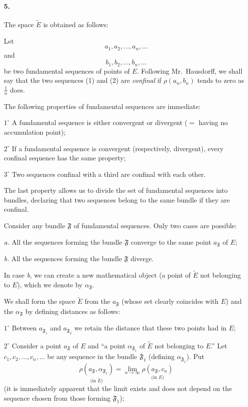 \documentclass[a4paper,12pt]{amsart}
\newcommand{\fais}{\mathfrak{F}}
\newcommand{\srcpage}[1]{} %
\begin{document}
\paragraph{5.}
The space $\widetilde{E}$ is obtained as follows:

Let
\begin{equation}\tag{1}
a_1,a_2,\dots,a_n,\dots
\end{equation}
and
\begin{equation}\tag{2}
b_1,b_2,\dots,b_n,\dots
\end{equation}
be two fundamental sequences of points of $E$. Following Mr.~Hausdorff, we shall say that the two sequences (1) and (2) are \textit{confinal} if $\rho(a_n,b_n)$ tends to zero as $\frac{1}{n}$ does.

The following properties of fundamental sequences are immediate:

$1^\circ$ A fundamental sequence is either convergent or divergent ($=$ having no accumulation point);

$2^\circ$ If a fundamental sequence is convergent (respectively, divergent), every confinal sequence has the same property;

$3^\circ$ Two sequences confinal with a third are confinal with each other.

The last property allows us to divide the set of fundamental sequences into bundles, declaring that two sequences belong to the same bundle if they are confinal.

Consider any bundle $\fais$ of fundamental sequences. Only two cases are possible:

\textit{a.} All the sequences forming the bundle $\fais$ converge to the same point $a_{\fais}$ of $E$;

\textit{b.} All the sequences forming the bundle $\fais$ diverge.

In case \textit{b}, we can create a new mathematical object (a point of $\widetilde{E}$ not belonging to $E$), which we denote by $\alpha_{\fais}$.

We shall form the space $\widetilde{E}$ from the $a_{\fais}$ (whose set clearly coincides with $E$) and the $\alpha_{\fais}$ by defining distances as follows:
\srcpage{48}

$1^\circ$ Between $a_{\fais_1}$ and $a_{\fais_2}$ we retain the distance that these two points had in $E$;

$2^\circ$ Consider a point $a_{\fais}$ of $E$ and ``a point $\alpha_{\fais_1}$ of $\widetilde{E}$ not belonging to $E$.'' Let $c_1,c_2,\dots,c_n,\dots$ be any sequence in the bundle $\fais_1$ (defining $\alpha_{\fais_1}$). Put
\[
\underset{\text{(in $\widetilde{E}$)}}{\rho(a_{\fais},\alpha_{\fais_1})}
=\lim_{n\to\infty}\underset{\text{(in $E$)}}{\rho(a_{\fais},c_n)}
\]
(it is immediately apparent that the limit exists and does not depend on the sequence chosen from those forming $\fais_1$);
\end{document}
